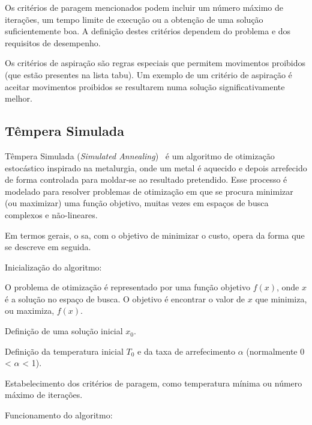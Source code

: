 Os critérios de paragem mencionados podem incluir um número máximo de iterações, um tempo limite de execução ou a obtenção de uma solução suficientemente boa. A definição destes critérios dependem do problema e dos requisitos de desempenho.

Os critérios de aspiração são regras especiais que permitem movimentos proibidos (que estão presentes na lista tabu). Um exemplo de um critério de aspiração é aceitar movimentos proibidos se resultarem numa solução significativamente melhor.

\subsection{Têmpera Simulada}
\label{explic:simulated-annealing}

Têmpera Simulada (\textit{Simulated Annealing})~\cite{MetaheuristicsDesignImplementation-Talbi-2009} é um algoritmo de otimização estocástico inspirado na metalurgia, onde um metal é aquecido e depois arrefecido de forma controlada para moldar-se ao resultado pretendido. Esse processo é modelado para resolver problemas de otimização em que se procura minimizar (ou maximizar) uma função objetivo, muitas vezes em espaços de busca complexos e não-lineares.

Em termos gerais, o \gls{sa}, com o objetivo de minimizar o custo, opera da forma que se descreve em seguida.

Inicialização do algoritmo:

\begin{compactitem}
    \item O problema de otimização é representado por uma função objetivo $f(x)$, onde $x$ é a solução no espaço de busca. O objetivo é encontrar o valor de $x$ que minimiza, ou maximiza, $f(x)$.

    \item Definição de uma solução inicial $x_0$.

    \item Definição da temperatura inicial $T_0$ e da taxa de arrefecimento $\alpha$ (normalmente 0 < $\alpha$ < 1).

    \item Estabelecimento dos critérios de paragem, como temperatura mínima ou número máximo de iterações.
\end{compactitem}

Funcionamento do algoritmo:

